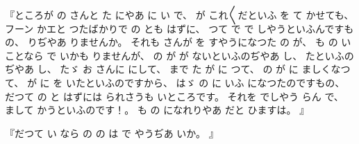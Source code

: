 
%
『ところが
の
さんと
た
にやあ
に
い
で、
%
が
これ〳〵だといふ
を
て
かせても、
%
フーン
かエと
つたばかりで
の
とも
はずに、
%
つて
で
で
しやうといふんですもの、
%
りぢやあ
りませんか。
%
それも
さんが
を
すやうになつた
の
が、
%
も
の
いことなら
で
いかも
りませんが、
%
の
が
が
ないといふのぢやあ
し、
%
たといふのぢやあ
し、
%
たゞ
お
さんに
にして、
%
まで
た
が
に
つて、
%
の
が
に
ましくなつて、
%
が
に
を
いたといふのですから、
%
はゞ
の
に
いふ
になつたのですもの、
%
だつて
の
と
はずには
られさうも
いところです。
%
それを
でしやう
らん
で、
%
まして
かうといふのです！。
%
も
の
になれりやあ%
だと
ひますは。
』

%
『だつて
い
なら
の
の
は
で
やうぢあ
いか。
』

